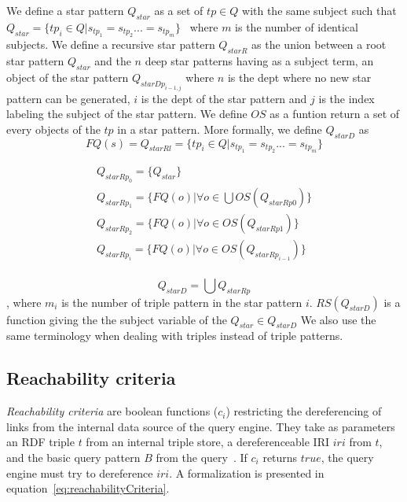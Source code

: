 \begin{definition}\label{def:starPattern}
    We define a star pattern $Q_{star}$ as a set of $tp \in Q$ with the same subject such that $Q_{star} = \{ tp_i \in Q| s_{tp_1} = s_{tp_2} ... = s_{tp_m}\}$~\cite{Karim2020}
    where $m$ is the number of identical subjects.
    We define a recursive star pattern $Q_{starR}$ as the union between a root star pattern $Q_{star}$ and the $n$ deep star patterns
    having as a subject term, an object of the star pattern $Q_{starDp_{i-1,j}}$ where $n$ is the dept where no new star pattern can be generated,
    $i$ is the dept of the star pattern and $j$ is the index labeling the subject of the star pattern.
    We define $OS$ as a funtion return a set of every objects of the $tp$ in a star pattern.
    More formally, we define $Q_{starD}$ as
    \begin{equation}
        FQ(s) = Q_{starRl} = \{tp_i \in Q| s_{tp_1} = s_{tp_2} ... = s_{tp_m}\}
    \end{equation}

    \begin{multline}
        Q_{starRp_0} = \{Q_{star}\} \\
        Q_{starRp_1} = \{FQ(o) |\forall o \in \bigcup OS(Q_{starRp0})\} \\
        Q_{starRp_2} = \{FQ(o)|\forall o \in OS(Q_{starRp1})\} \\
        Q_{starRp_i} = \{FQ(o)|\forall o \in OS(Q_{starRp_{i-1}})\} \\
    \end{multline}

    \begin{equation}
        Q_{starD}= \bigcup Q_{starRp}
    \end{equation},
    where $m_i$ is the number of triple pattern in the star pattern $i$.
    $RS(Q_{starD})$ is a function giving the the subject variable of the $Q_{star} \in Q_{starD}$
    We also use the same terminology when dealing with triples instead of triple patterns.
\end{definition}

\subsection{Reachability criteria}

\emph{Reachability criteria} are boolean functions ($c_i$) restricting the dereferencing of links from the internal data source of the query engine.
They take as parameters an RDF triple $t$ from an internal triple store, a dereferenceable IRI $iri$ from $t$, and the basic query pattern $B$ from the query~\cite{Hartig2012}.
If $c_i$ returns $true$, the query engine must try to dereference $iri$.
A formalization is presented in equation~\ref{eq:reachabilityCriteria}.


